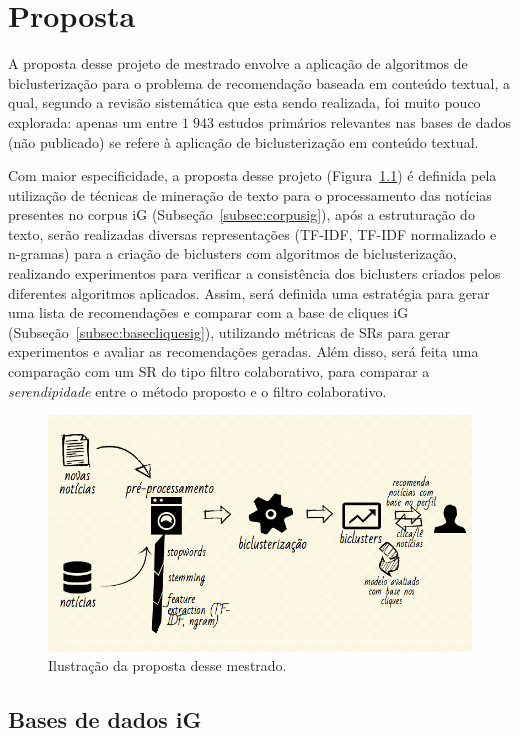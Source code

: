 \documentclass[normaltoc, espacoumemeio, pnumromarab,ruledheader]{abnt}
\begin{document}
\chapter{Proposta}

A proposta desse projeto de mestrado envolve a aplicação de algoritmos de biclusterização para o problema de recomendação baseada em conteúdo textual, a qual, segundo a revisão sistemática que esta sendo realizada, foi muito pouco explorada: apenas um entre $1\;943$ estudos primários relevantes nas bases de dados (não publicado) se refere à aplicação de biclusterização em conteúdo textual.

Com maior especificidade, a proposta desse projeto (Figura~\ref{fig:proposta}) é definida pela utilização de técnicas de mineração de texto para o processamento das notícias presentes no corpus iG (Subseção~\ref{subsec:corpusig}), após a estruturação do texto, serão realizadas diversas representações (TF-IDF, TF-IDF normalizado e n-gramas) para a criação de biclusters com algoritmos de biclusterização, realizando experimentos para verificar a consistência dos biclusters criados pelos diferentes algoritmos aplicados.
Assim, será definida uma estratégia para gerar uma lista de recomendações e comparar com a base de cliques iG (Subseção~\ref{subsec:basecliquesig}), utilizando métricas de SRs para gerar experimentos e avaliar as recomendações geradas. Além disso, será feita uma comparação com um SR do tipo filtro colaborativo, para comparar a \textit{serendipidade} entre o método proposto e o filtro colaborativo.

\begin{figure}[h]
\centering
\includegraphics[width=120mm]{img/proposal.png}
\caption{Ilustração da proposta desse mestrado.}
\label{fig:proposta}
\end{figure}

\section{Bases de dados iG}
\label{sec:basesig}
\end{document}
